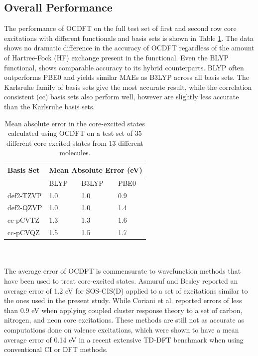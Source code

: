 \documentclass[12pt]{article}
\begin{document}
\subsection{Overall Performance}
The performance of OCDFT on the full test set of first and second row core excitations with different functionals and basis sets is shown in Table \ref{table:OverallPerformance}. The data shows no dramatic difference in the accuracy of OCDFT regardless of the amount of Hartree-Fock (HF) exchange present in the functional. Even the BLYP functional, shows comparable accuracy to its hybrid counterparts. BLYP often outperforms PBE0 and yields similar MAEs as B3LYP across all basis sets. The Karlsruhe family of basis sets give the most accurate result, while the correlation consistent (cc) basis sets also perform well, however are slightly less accurate than the Karlsruhe basis sets.
\begin{table}[!ht]
    \begin{tabular}{l@{\hskip 0.5in}lll}
    \hline
    \hline
Basis Set & \multicolumn{3}{c}{Mean Absolute Error (eV)}  \\
\hline
& BLYP & B3LYP & PBE0\\
def2-TZVP & 1.0 & 1.0 & 0.9 \\
def2-QZVP & 1.0 & 1.0 & 1.4 \\
cc-pCVTZ & 1.3 & 1.3 & 1.6 \\
cc-pCVQZ & 1.5 & 1.5 & 1.7 \\
\end{tabular}
    \caption{Mean absolute error in the core-excited states calculated using OCDFT on a test set of 35 different core excited states from 13 different molecules.}
    \label{table:OverallPerformance}
\end{table}
\\ \\ 
The average error of OCDFT is commensurate to wavefunction methods that have been used to treat core-excited states. Asmuruf and Besley\cite{asmuruf_calculation_2008} reported an average error of 1.2 eV for SOS-CIS(D) applied to a set of excitations similar to the ones used in the present study. While Coriani et al.\cite{coriani_coupled-cluster_2012} reported errors of less than 0.9 eV when applying coupled cluster response theory to a set of carbon, nitrogen, and neon core excitations. These methods are still not as accurate as computations done on valence excitations, which were shown to have a mean average error of 0.14 eV in a recent extensive TD-DFT benchmark when using conventional CI or DFT methods. \cite{jacquemin_extensive_2009} 
\end{document}
